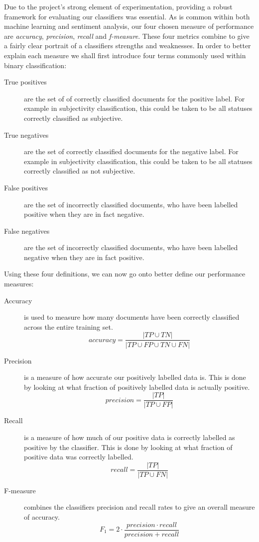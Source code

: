 Due to the project's strong element of experimentation, providing a robust framework for evaluating our classifiers was essential. As is common within both machine learning and sentiment analysis, our four chosen measure of performance are \emph{accuracy}, \emph{precision}, \emph{recall} and \emph{f-measure}. These four metrics combine to give a fairly clear portrait of a classifiers strengths and weaknesses. In order to better explain each measure we shall first introduce four terms commonly used within binary classification:

\begin{description}
	\item [True positives] are the set of of correctly classified documents for the positive label. For example in subjectivity classification, this could be taken to be all statuses correctly classified as subjective.
	\item [True negatives] are the set of correctly classified documents for the negative label. For example in subjectivity classification, this could be taken to be all statuses correctly classified as not subjective.
	\item [False positives] are the set of incorrectly classified documents, who have been labelled positive when they are in fact negative.
	\item [False negatives] are the set of incorrectly classified documents, who have been labelled negative when they are in fact positive.
\end{description}

Using these four definitions, we can now go onto better define our performance measures:

\begin{description}
	\item [Accuracy] is used to measure how many documents have been correctly classified across the entire training set.
	\begin{equation}
		accuracy = \frac{| TP \cup TN |}{| TP \cup FP \cup TN \cup FN |}
	\end{equation}
	\item [Precision] is a measure of how accurate our positively labelled data is. This is done by looking at what fraction of positively labelled data is actually positive.
	\begin{equation}
		precision = \frac{| TP |}{| TP \cup FP |}
	\end{equation}
	\item [Recall] is a measure of how much of our positive data is correctly labelled as positive by the classifier. This is done by looking at what fraction of positive data was correctly labelled.
	\begin{equation}
		recall = \frac{| TP |}{| TP \cup FN |}
	\end{equation}
	\item [F-measure] combines the classifiers precision and recall rates to give an overall measure of accuracy.
	\begin{equation}
		F_1 = 2 \cdot \frac{precision \cdot recall}{precision + recall}
	\end{equation}
\end{description}

